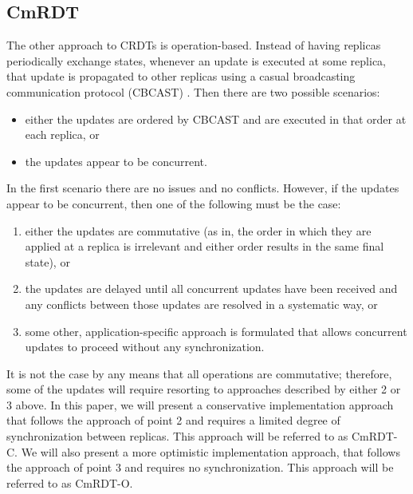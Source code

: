 \documentclass[sigconf,nonacm,10pt]{acmart}
\begin{document}
\subsection{CmRDT}
The other approach to CRDTs is operation-based. Instead of having replicas periodically exchange states, whenever an update is executed at some replica, that update is propagated to other replicas using a casual broadcasting communication protocol (CBCAST) \cite{baldoni2002fundamentals}. Then there are two possible scenarios:
\begin{itemize}
 \item either the updates are ordered by CBCAST and are executed in that order at each replica, or
 \item the updates appear to be concurrent.
\end{itemize}

In the first scenario there are no issues and no conflicts. However, if the updates appear to be concurrent, then one of the following must be the case:
\begin{enumerate}
 \item either the updates are commutative (as in, the order in which they are applied at a replica is irrelevant and either order results in the same final state), or
 \item the updates are delayed until all concurrent updates have been received and any conflicts between those updates are resolved in a systematic way, or
 \item some other, application-specific approach is formulated that allows concurrent updates to proceed without any synchronization.
\end{enumerate}

It is not the case by any means that all operations are commutative; therefore, some of the updates will require resorting to approaches described by either 2 or 3 above. In this paper, we will present a conservative implementation approach that follows the approach of point 2 and requires a limited degree of synchronization between replicas. This approach will be referred to as CmRDT-C. We will also present a more optimistic implementation approach, that follows the approach of point 3 and requires no synchronization. This approach will be referred to as CmRDT-O.
\end{document}
